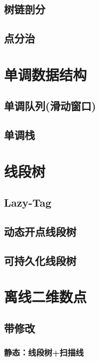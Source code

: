 \documentclass{article}
\begin{document}
		\subsection{树链剖分}
		
		\subsection{点分治}

	\newpage

	\section{单调数据结构}
		\subsection{单调队列(滑动窗口)}
		
		\subsection{单调栈}

	\newpage

	\section{线段树}
		\subsection{Lazy-Tag} %

		\subsection{动态开点线段树}

		\subsection{可持久化线段树}

	\section{离线二维数点}
		\subsection{带修改}
			\subsubsection{静态：线段树+扫描线}
\end{document}
